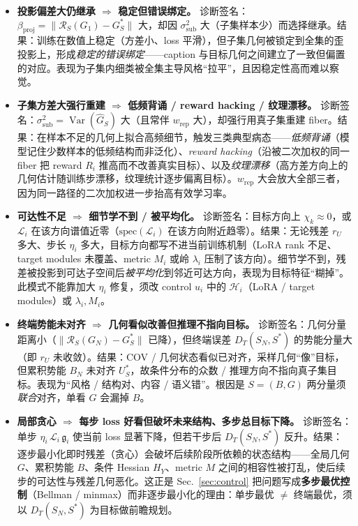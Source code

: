 \documentclass[11pt,a4paper]{article}
\DeclareMathOperator{\Var}{Var}
\newcommand{\cH}{\mathcal{H}}   %
\newcommand{\cL}{\mathcal{L}}   %
\newcommand{\Rstr}{\mathcal{R}}     %
\newcommand{\gres}{\bm{\mathfrak{g}}} %
\begin{document}
\begin{itemize}
\item[(i)] \textbf{投影偏差大仍继承 $\Rightarrow$ 稳定但错误绑定。}\;
诊断签名：$\beta_{\mathrm{proj}}=\|\Rstr_S(G_1)-G_S^*\|$ 大，却因 $\sigma_{\mathrm{sub}}^2$ 大（子集样本少）而选择继承。结果：训练在数值上稳定（方差小、loss 平滑），但子集几何被锁定到全集的歪投影上，形成\emph{稳定的错误绑定}——caption 与目标几何之间建立了一致但偏置的对应。表现为子集内细类被全集主导风格“拉平”，且因稳定性高而难以察觉。

\item[(ii)] \textbf{子集方差大强行重建 $\Rightarrow$ 低频背诵 / reward hacking / 纹理漂移。}\;
诊断签名：$\sigma_{\mathrm{sub}}^2=\Var(\widehat{G}_S)$ 大（且常伴 $w_{\mathrm{rep}}$ 大），却强行用真子集重建 fiber。结果：在样本不足的几何上拟合高频细节，触发三类典型病态——\emph{低频背诵}（模型记住少数样本的低频结构而非泛化）、\emph{reward hacking}（沿被二次加权的同一 fiber 把 reward $R_i$ 推高而不改善真实目标）、以及\emph{纹理漂移}（高方差方向上的几何估计随训练步漂移，纹理统计逐步偏离目标）。$w_{\mathrm{rep}}$ 大会放大全部三者，因为同一路径的二次加权进一步抬高有效学习率。

\item[(iii)] \textbf{可达性不足 $\Rightarrow$ 细节学不到 / 被平均化。}\;
诊断签名：目标方向上 $\chi_k\approx0$，或 $\cL_i$ 在该方向谱值近零（$\mathrm{spec}(\cL_i)$ 在该方向附近趋零）。结果：无论残差 $r_U$ 多大、步长 $\eta_i$ 多大，目标方向都写不进当前训练机制（LoRA rank 不足、target modules 未覆盖、metric $M_i$ 或岭 $\lambda_i$ 压制了该方向）。细节学不到，残差被投影到可达子空间后\emph{被平均化}到邻近可达方向，表现为目标特征“糊掉”。此模式不能靠加大 $\eta_i$ 修复，须改 control $u_i$ 中的 $\cH_i$（LoRA / target modules）或 $\lambda_i,M_i$。

\item[(iv)] \textbf{终端势能未对齐 $\Rightarrow$ 几何看似改善但推理不指向目标。}\;
诊断签名：几何分量距离小（$\|\Rstr_S(G_N)-G_S^*\|$ 已降），但终端误差 $D_T(S_N,S^*)$ 的势能分量大（即 $r_U$ 未收敛）。结果：COV / 几何状态看似已对齐，采样几何“像”目标，但累积势能 $B_N$ 未对齐 $U_S^*$，故条件分布的众数 / 推理方向不指向真子集目标。表现为“风格 / 结构对、内容 / 语义错”。根因是 $S=(B,G)$ 两分量须\emph{联合}对齐，单看 $G$ 会漏掉 $B$。

\item[(v)] \textbf{局部贪心 $\Rightarrow$ 每步 loss 好看但破坏未来结构、多步总目标下降。}\;
诊断签名：单步 $\eta_i\,\cL_i\,\gres_i$ 使当前 loss 显著下降，但若干步后 $D_T(S_N,S^*)$ 反升。结果：逐步最小化即时残差（贪心）会破坏后续阶段所依赖的状态结构——全局几何 $G$、累积势能 $B$、条件 Hessian $H_Y$、metric $M$ 之间的相容性被打乱，使后续步的可达性与残差几何恶化。这正是 Sec.~\ref{sec:control} 把问题写成\textbf{多步最优控制}（Bellman / minmax）而非逐步最小化的理由：单步最优 $\neq$ 终端最优，须以 $D_T(S_N,S^*)$ 为目标做前瞻规划。
\end{itemize}
\end{document}
